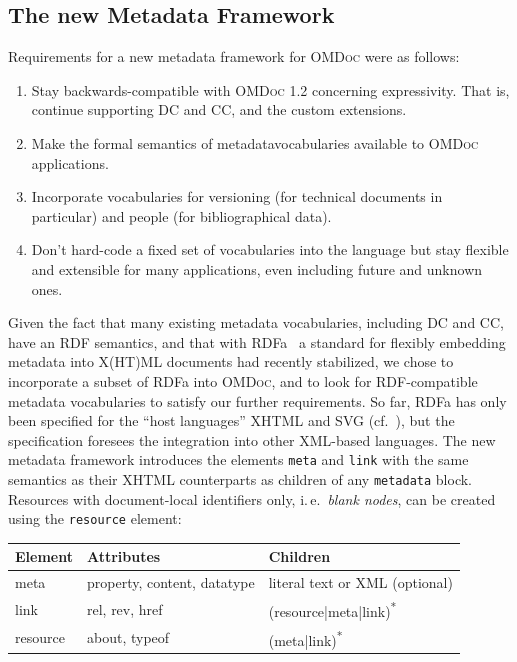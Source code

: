 \documentclass{llncs}
\renewcommand{\omdoc}{\textsc{OMDoc}\xspace}
\begin{document}
\subsection{The new Metadata Framework}\label{sec:new-metadata}

Requirements for a new metadata framework for \omdoc were as follows:

\begin{enumerate}
\item Stay backwards-compatible with \omdoc 1.2 concerning expressivity.  That is,
  continue supporting DC and CC, and the custom extensions.
\item Make the formal semantics of \ifpublic\else metadata\fi vocabularies available to
  \omdoc applications.
\item Incorporate vocabularies for versioning (for technical documents in particular) and
  people (for bibliographical data).
\item Don't hard-code a fixed set of vocabularies into the language but stay flexible and
  extensible for many applications, \ifpublic even \else including \fi future and unknown
  ones.
\end{enumerate}

Given the fact that many existing metadata vocabularies, including DC and CC, have an RDF
semantics, and that with RDFa~\cite{AdidaEtAl08:RDFa} a standard for flexibly embedding
metadata into X(HT)ML documents had recently stabilized, we chose to incorporate a subset
of RDFa into \omdoc, and to look for RDF-compatible metadata vocabularies to satisfy our
further requirements.  So far, RDFa has only been specified for the ``host languages''
XHTML and SVG (cf.~\cite{W3C08:SVGTiny1.2}), but the specification foresees the
integration into other XML-based languages.  The new metadata framework introduces the
elements \texttt{meta} and \texttt{link} with the same semantics as their XHTML
counterparts as children of any \texttt{metadata} block.  Resources with document-local
identifiers only, i.\,e.\ \emph{blank nodes}, can be created using the \texttt{resource}
element:

\begin{tabular}{|l|l|l|}
  \hline
  Element & Attributes & Children \\
  \hline
  meta & property, content, datatype & literal text or XML (optional) \\
  link & rel, rev, href & (resource|meta|link)\textsuperscript{*} \\
  resource & about, typeof & (meta|link)\textsuperscript{*} \\
  \hline
\end{tabular}
\end{document}
